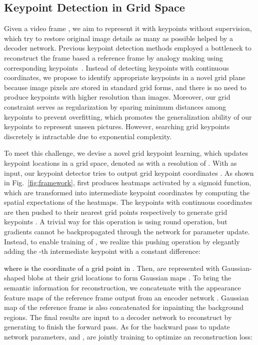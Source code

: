 \documentclass[letterpaper, 10 pt, conference]{ieeeconf}
\newcommand{\gao}[1]{{\textcolor{black}{#1}}}
\begin{document}
\subsection{Keypoint Detection in Grid Space}
\label{sec:detnet}
Given a video frame , we aim to represent it with  keypoints without supervision, which try to restore original image details as many as possible helped by a decoder network. 
Previous keypoint detection methods employed a bottleneck to reconstruct the frame  based a reference frame  by analogy making using corresponding keypoints~\cite{jakab2018unsupervised,minderer2019unsupervised}. 
Instead of detecting keypoints with continuous coordinates, we propose to identify appropriate keypoints in a novel grid plane because image pixels are stored in standard grid forms, and there is no need to produce keypoints with higher resolution than images. 
Moreover, our grid constraint serves as regularization by sparing minimum distances among keypoints to prevent overfitting, which promotes the generalization ability of our keypoints to represent unseen pictures. 
However, searching grid keypoints discretely is intractable due to exponential complexity. 



To meet this challenge, we devise a novel grid keypoint learning, which updates keypoint locations in a grid space, denoted as  with a resolution of .
With  as input, our keypoint detector  tries to output  grid keypoint coordinates .
As shown in Fig.~\ref{fig:framework},  first produces  heatmaps  activated by a sigmoid function, which are transformed into intermediate keypoint coordinates  by computing the spatial expectations of the heatmaps.
The  keypoints with continuous coordinates are then pushed to their nearest grid points respectively to generate grid keypoints . 
A trivial way for this operation is using round operation, but gradients cannot be backpropagated through the network for parameter update. 
Instead, to enable training of , we realize this pushing operation by elegantly adding the -th intermediate keypoint  with a constant difference:

\gao{where  is the coordinate of a grid point in .}
Then,  are 
represented with Gaussian-shaped blobs at their grid locations to form Gaussian maps . 
To bring the semantic information for reconstruction, we concatenate  with the appearance feature maps of the reference frame  output from an encoder network .
Gaussian map of the reference frame  is also concatenated for inpainting the background regions.
The final results are input to a decoder network  to reconstruct  by generating  to finish the forward pass.
As for the backward pass to update network parameters,  and , 
are jointly training to optimize an  reconstruction loss:
\end{document}
